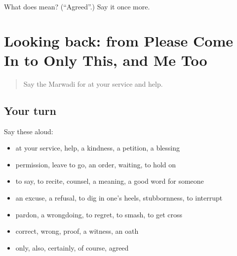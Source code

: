 \begin{tcolorbox}[breakable,colback=teal!4,colframe=teal!35!black,title={Before you move on}]
What does  mean? (\textquotedblleft{}Agreed\textquotedblright{}.) Say it once more.
\end{tcolorbox}
\section[(dialogue)]{Looking back: from Please Come In to Only This, and Me Too}

\label{lesson:MW-R272-review-266-272}



\begin{quote}
Say the Marwadi for at your service and help.
\end{quote}

\subsection*{Your turn}
Say these aloud:

\begin{itemize}
\raggedright
  \item at your service, help, a kindness, a petition, a blessing
  \item permission, leave to go, an order, waiting, to hold on
  \item to say, to recite, counsel, a meaning, a good word for someone
  \item an excuse, a refusal, to dig in one's heels, stubbornness, to interrupt
  \item pardon, a wrongdoing, to regret, to smash, to get cross
  \item correct, wrong, proof, a witness, an oath
  \item only, also, certainly, of course, agreed
\end{itemize}


